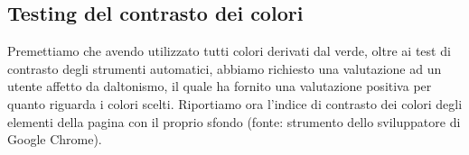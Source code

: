 \subsection{Testing del contrasto dei colori}
Premettiamo che avendo utilizzato tutti colori derivati dal verde, oltre ai test di contrasto degli strumenti automatici, abbiamo richiesto una valutazione ad un utente affetto da daltonismo, il quale ha fornito una valutazione positiva per quanto riguarda i colori scelti.
Riportiamo ora l'indice di contrasto dei colori degli elementi della pagina con il proprio sfondo (fonte: strumento dello sviluppatore di Google Chrome).
